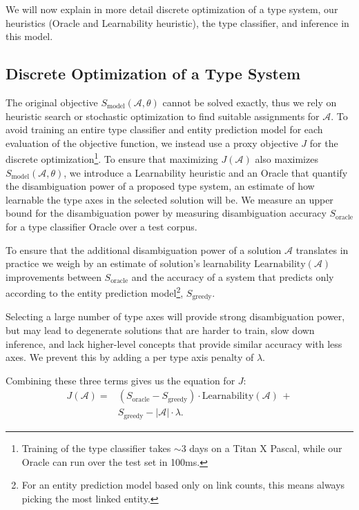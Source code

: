 \documentclass[letterpaper]{article}
\begin{document}
We will now explain in more detail discrete optimization of a type system, our heuristics (Oracle and Learnability heuristic), the type classifier, and inference in this model.

\subsection{Discrete Optimization of a Type System}
\label{para:objective}

The original objective $S_{\mathrm{model}}(\mathcal{A}, \theta)$ cannot be solved exactly, thus we rely on heuristic search or stochastic optimization to find suitable assignments for $\mathcal{A}$. To avoid training an entire type classifier and entity prediction model for each evaluation of the objective function, we instead use a proxy objective $J$ for the discrete optimization\footnote{Training of the type classifier takes $\sim$3 days on a Titan X Pascal, while our Oracle can run over the test set in 100ms.}. To ensure that maximizing $J(\mathcal{A})$ also maximizes $S_{\mathrm{model}}(\mathcal{A}, \theta)$, we introduce a Learnability heuristic and an Oracle that quantify the disambiguation power of a proposed type system, an estimate of how learnable the type axes in the selected solution will be. We measure an upper bound for the disambiguation power by measuring disambiguation accuracy $S_{\mathrm{oracle}}$ for a type classifier Oracle over a test corpus.

To ensure that the additional disambiguation power of a solution $\mathcal{A}$ translates in practice we weigh by an estimate of solution's learnability $\mathrm{Learnability}(\mathcal{A})$ improvements between $S_{\mathrm{oracle}}$ and the accuracy of a system that predicts only according to the entity prediction model\footnote{For an entity prediction model based only on link counts, this means always picking the most linked entity.}, $S_{\mathrm{greedy}}$.

Selecting a large number of type axes will provide strong disambiguation power, but may lead to degenerate solutions that are harder to train, slow down inference, and lack higher-level concepts that provide similar accuracy with less axes. We prevent this by adding a per type axis penalty of $\lambda$.

Combining these three terms gives us the equation for $J$:
\begin{equation}
\begin{split}
\label{eq:obj}
J(\mathcal{A}) =& (S_{\mathrm{oracle}} - S_{\mathrm{greedy}}) \cdot \mathrm{Learnability}(\mathcal{A})\,+ \\
&S_{\mathrm{greedy}} - |\mathcal A| \cdot \lambda
.
\end{split}
\end{equation}
\end{document}
